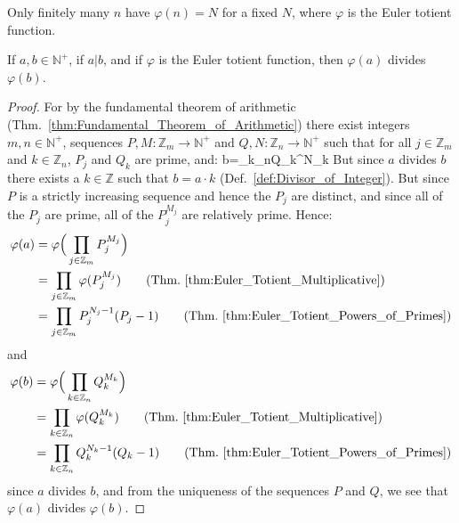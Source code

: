     Only finitely many $n$ have $\varphi(n)=N$ for a fixed $N$, where
    $\varphi$ is the Euler totient function.
    \begin{theorem}
        \label{thm:A_DIV_B_then_EulerTotA_Div_EulerTotB}%
        If $a,b\in\mathbb{N}^{+}$, if $a|b$, and if $\varphi$ is the
        Euler totient function, then $\varphi(a)$ divides $\varphi(b)$.
    \end{theorem}
    \begin{proof}
        For by the fundamental theorem of arithmetic
        (Thm.~\ref{thm:Fundamental_Theorem_of_Arithmetic}) there exist
        integers $m,n\in\mathbb{N}^{+}$, sequences
        $P,M:\mathbb{Z}_{m}\rightarrow\mathbb{N}^{+}$ and
        $Q,N:\mathbb{Z}_{n}\rightarrow\mathbb{N}^{+}$ such that for all
        $j\in\mathbb{Z}_{m}$ and $k\in\mathbb{Z}_{n}$, $P_{j}$ and
        $Q_{k}$ are prime, and:
                    {b=\prod_{k\in{}_{n}}Q_{k}^{N_{k}}}
        But since $a$ divides $b$ there exists a $k\in\mathbb{Z}$ such
        that $b=a\cdot{k}$ (Def.~\ref{def:Divisor_of_Integer}). But
        since $P$ is a strictly increasing sequence and hence the
        $P_{j}$ are distinct, and since all of the $P_{j}$ are prime,
        all of the $P_{j}^{M_{j}}$ are relatively prime. Hence:
        \begin{align*}
            \varphi(a)&=\varphi\Big(
                \prod_{j\in\mathbb{Z}_{m}}P_{j}^{M_{j}}
            \Big)\\
            &=\prod_{j\in\mathbb{Z}_{m}}\varphi(P_{j}^{M_{j}})
                \tag{Thm.~\ref{thm:Euler_Totient_Multiplicative}}\\
            &=\prod_{j\in\mathbb{Z}_{m}}P_{j}^{N_{j}-1}(P_{j}-1)
                \tag{Thm.~\ref{thm:Euler_Totient_Powers_of_Primes}}
        \end{align*}
        and
        \begin{align*}
            \varphi(b)&=\varphi\Big(
                \prod_{k\in\mathbb{Z}_{n}}Q_{k}^{M_{k}}
            \Big)\\
            &=\prod_{k\in\mathbb{Z}_{n}}\varphi(Q_{k}^{M_{k}})
                \tag{Thm.~\ref{thm:Euler_Totient_Multiplicative}}\\
            &=\prod_{k\in\mathbb{Z}_{n}}Q_{k}^{N_{k}-1}(Q_{k}-1)
                \tag{Thm.~\ref{thm:Euler_Totient_Powers_of_Primes}}
        \end{align*}
        since $a$ divides $b$, and from the uniqueness of the sequences
        $P$ and $Q$, we see that $\varphi(a)$ divides $\varphi(b)$.
    \end{proof}